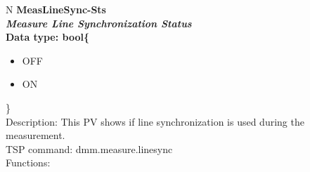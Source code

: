\documentclass[openany]{article}
\begin{document}
		\begin{tabular}{N}
			\hline
			\bfseries MeasLineSync-Sts\label{pv:measlinesync-sts} \\ \hline
			\emph{Measure Line Synchronization Status} \\
			Data type: bool\{\begin{itemize}[noitemsep]
				\small
				\item[] OFF
				\item[] ON
			\end{itemize}\} \\
			Description: This PV shows if line synchronization is used during the measurement. \\
			TSP command: dmm.measure.linesync \\
			Functions: \\
			\arrayrulecolor{\FuncTableBorderColor}

		\end{tabular}
\end{document}
